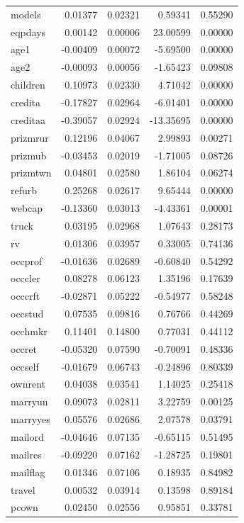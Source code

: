 \documentclass[
]{article}
\begin{document}
\begin{longtable}[]{@{}lrrrr@{}}
models & 0.01377 & 0.02321 & 0.59341 & 0.55290 \\
eqpdays & 0.00142 & 0.00006 & 23.00599 & 0.00000 \\
age1 & -0.00409 & 0.00072 & -5.69500 & 0.00000 \\
age2 & -0.00093 & 0.00056 & -1.65423 & 0.09808 \\
children & 0.10973 & 0.02330 & 4.71042 & 0.00000 \\
credita & -0.17827 & 0.02964 & -6.01401 & 0.00000 \\
creditaa & -0.39057 & 0.02924 & -13.35695 & 0.00000 \\
prizmrur & 0.12196 & 0.04067 & 2.99893 & 0.00271 \\
prizmub & -0.03453 & 0.02019 & -1.71005 & 0.08726 \\
prizmtwn & 0.04801 & 0.02580 & 1.86104 & 0.06274 \\
refurb & 0.25268 & 0.02617 & 9.65444 & 0.00000 \\
webcap & -0.13360 & 0.03013 & -4.43361 & 0.00001 \\
truck & 0.03195 & 0.02968 & 1.07643 & 0.28173 \\
rv & 0.01306 & 0.03957 & 0.33005 & 0.74136 \\
occprof & -0.01636 & 0.02689 & -0.60840 & 0.54292 \\
occcler & 0.08278 & 0.06123 & 1.35196 & 0.17639 \\
occcrft & -0.02871 & 0.05222 & -0.54977 & 0.58248 \\
occstud & 0.07535 & 0.09816 & 0.76766 & 0.44269 \\
occhmkr & 0.11401 & 0.14800 & 0.77031 & 0.44112 \\
occret & -0.05320 & 0.07590 & -0.70091 & 0.48336 \\
occself & -0.01679 & 0.06743 & -0.24896 & 0.80339 \\
ownrent & 0.04038 & 0.03541 & 1.14025 & 0.25418 \\
marryun & 0.09073 & 0.02811 & 3.22759 & 0.00125 \\
marryyes & 0.05576 & 0.02686 & 2.07578 & 0.03791 \\
mailord & -0.04646 & 0.07135 & -0.65115 & 0.51495 \\
mailres & -0.09220 & 0.07162 & -1.28725 & 0.19801 \\
mailflag & 0.01346 & 0.07106 & 0.18935 & 0.84982 \\
travel & 0.00532 & 0.03914 & 0.13598 & 0.89184 \\
pcown & 0.02450 & 0.02556 & 0.95851 & 0.33781 \\

\end{longtable}
\end{document}
